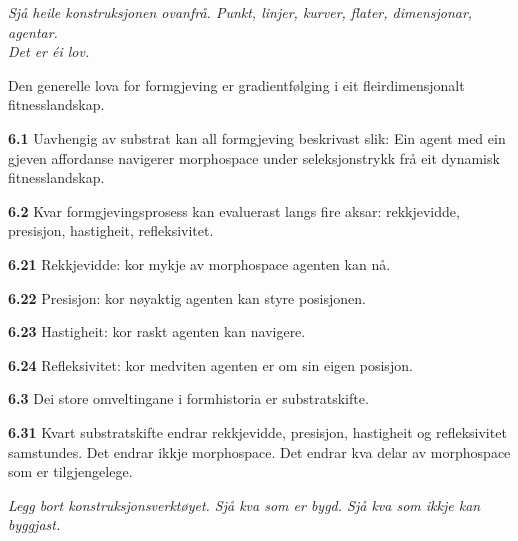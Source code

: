 \documentclass[11pt, a4paper]{article}
\newcommand{\prop}[1]{\bigskip\noindent{\Large\textbf{\textcolor{propcolor}{#1}}}\quad}
\newcommand{\subprop}[1]{\medskip\noindent\textbf{#1}\quad}
\begin{document}
\vspace{1.5em}
\begin{center}
\emph{Sj\aa{} heile konstruksjonen ovanfr\aa. Punkt, linjer, kurver, flater, dimensjonar, agentar.\\Det er \'ei lov.}
\end{center}
\vspace{1.5em}



\prop{6} Den generelle lova for formgjeving er gradientf\o lging i eit fleirdimensjonalt fitnesslandskap.

\subprop{6.1} Uavhengig av substrat kan all formgjeving beskrivast slik: Ein agent med ein gjeven affordanse navigerer morphospace under seleksjonstrykk fr\aa{} eit dynamisk fitnesslandskap.

\subprop{6.2} Kvar formgjevingsprosess kan evaluerast langs fire aksar: rekkjevidde, presisjon, hastigheit, refleksivitet.

\subprop{6.21} Rekkjevidde: kor mykje av morphospace agenten kan n\aa.

\subprop{6.22} Presisjon: kor n\o yaktig agenten kan styre posisjonen.

\subprop{6.23} Hastigheit: kor raskt agenten kan navigere.

\subprop{6.24} Refleksivitet: kor medviten agenten er om sin eigen posisjon.

\subprop{6.3} Dei store omveltingane i formhistoria er substratskifte.

\subprop{6.31} Kvart substratskifte endrar rekkjevidde, presisjon, hastigheit og refleksivitet samstundes. Det endrar ikkje morphospace. Det endrar kva delar av morphospace som er tilgjengelege.



\vspace{1.5em}
\begin{center}
\emph{Legg bort konstruksjonsverkt\o yet. Sj\aa{} kva som er bygd. Sj\aa{} kva som ikkje kan byggjast.}
\end{center}
\vspace{1.5em}


\end{document}
